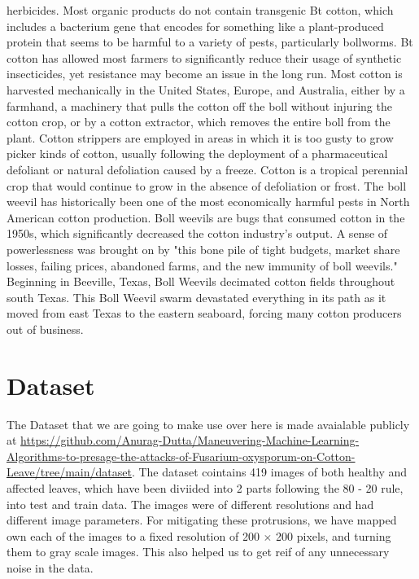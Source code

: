 \documentclass[conference]{IEEEtran}
\begin{document}
herbicides. Most organic products do not contain transgenic Bt cotton, which includes a bacterium gene that encodes for something like a plant-produced protein that seems to be harmful to a variety of pests, particularly bollworms. Bt cotton has allowed most farmers to significantly reduce their usage of synthetic insecticides, yet resistance may become an issue in the long run. Most cotton is harvested mechanically in the United States, Europe, and Australia, either by a farmhand, a machinery that pulls the cotton off the boll without injuring the cotton crop, or by a cotton extractor, which removes the entire boll from the plant. Cotton strippers are employed in areas in which it is too gusty to grow picker kinds of cotton, usually following the deployment of a pharmaceutical defoliant or natural defoliation caused by a freeze. Cotton is a tropical perennial crop that would continue to grow in the absence of defoliation or frost. The boll weevil has historically been one of the most economically harmful pests in North American cotton production. Boll weevils are bugs that consumed cotton in the 1950s, which significantly decreased the cotton industry's output. A sense of powerlessness was brought on by "this bone pile of tight budgets, market share losses, failing prices, abandoned farms, and the new immunity of boll weevils." Beginning in Beeville, Texas, Boll Weevils decimated cotton fields throughout south Texas. This Boll Weevil swarm devastated everything in its path as it moved from east Texas to the eastern seaboard, forcing many cotton producers out of business.
\section{Dataset}
The Dataset that we are going to make use over here is made avaialable publicly at \href{https://github.com/Anurag-Dutta/Maneuvering-Machine-Learning-Algorithms-to-presage-the-attacks-of-Fusarium-oxysporum-on-Cotton-Leave/tree/main/dataset}{https://github.com/Anurag-Dutta/Maneuvering-Machine-Learning-Algorithms-to-presage-the-attacks-of-Fusarium-oxysporum-on-Cotton-Leave/tree/main/dataset}. The dataset cointains 419 images of both healthy and affected leaves, which have been diviided into 2 parts following the 80 - 20 rule, into test and train data. The images were of different resolutions and had different image parameters. For mitigating these protrusions, we have mapped own each of the images to a fixed resolution of 200 $\times$ 200 pixels, and turning them to gray scale images. This also helped us to get reif of any unnecessary noise in the data. 
\end{document}
